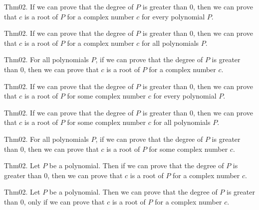 \documentclass{article}
\begin{document}
Thm02. If we can prove that the degree of $P$ is greater than $0$, then we can prove that $c$ is a root of $P$ for a complex number $c$ for every polynomial $P$.

Thm02. If we can prove that the degree of $P$ is greater than $0$, then we can prove that $c$ is a root of $P$ for a complex number $c$ for all polynomials $P$.

Thm02. For all polynomials $P$, if we can prove that the degree of $P$ is greater than $0$, then we can prove that $c$ is a root of $P$ for a complex number $c$.

Thm02. If we can prove that the degree of $P$ is greater than $0$, then we can prove that $c$ is a root of $P$ for some complex number $c$ for every polynomial $P$.

Thm02. If we can prove that the degree of $P$ is greater than $0$, then we can prove that $c$ is a root of $P$ for some complex number $c$ for all polynomials $P$.

Thm02. For all polynomials $P$, if we can prove that the degree of $P$ is greater than $0$, then we can prove that $c$ is a root of $P$ for some complex number $c$.

Thm02. Let $P$ be a polynomial. Then if we can prove that the degree of $P$ is greater than $0$, then we can prove that $c$ is a root of $P$ for a complex number $c$.

Thm02. Let $P$ be a polynomial. Then we can prove that the degree of $P$ is greater than $0$, only if we can prove that $c$ is a root of $P$ for a complex number $c$.
\end{document}
